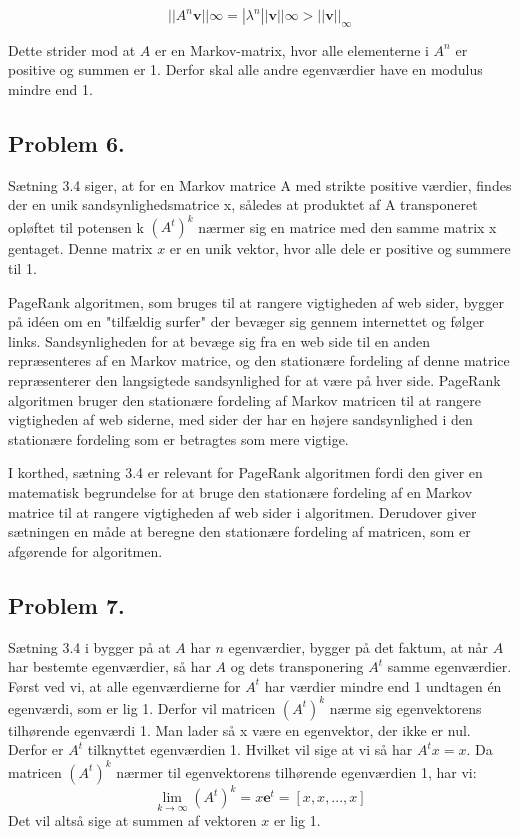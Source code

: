 $$||A^n\mathbf{v}||\infty = |\lambda^n||\mathbf{v}||\infty > ||\mathbf{v}||_\infty$$

Dette strider mod at $A$ er en Markov-matrix, hvor alle elementerne i $A^n$ er positive og summen er 1. Derfor skal alle andre egenværdier have en modulus mindre end 1.


\subsection*{Problem 6.}

Sætning 3.4 siger, at for en Markov matrice A med strikte positive værdier, findes der en unik sandsynlighedsmatrice x, således at produktet af A transponeret opløftet til potensen k $(A^t)^k$ nærmer sig en matrice med den samme matrix x gentaget. Denne matrix $x$ er en unik vektor, hvor alle dele er positive og summere til 1.

PageRank algoritmen, som bruges til at rangere vigtigheden af web sider, bygger på idéen om en "tilfældig surfer" der bevæger sig gennem internettet og følger links. Sandsynligheden for at bevæge sig fra en web side til en anden repræsenteres af en Markov matrice, og den stationære fordeling af denne matrice repræsenterer den langsigtede sandsynlighed for at være på hver side. PageRank algoritmen bruger den stationære fordeling af Markov matricen til at rangere vigtigheden af web siderne, med sider der har en højere sandsynlighed i den stationære fordeling som er betragtes som mere vigtige.

I korthed, sætning 3.4 er relevant for PageRank algoritmen fordi den giver en matematisk begrundelse for at bruge den stationære fordeling af en Markov matrice til at rangere vigtigheden af web sider i algoritmen. Derudover giver sætningen en måde at beregne den stationære fordeling af matricen, som er afgørende for algoritmen.

\newpage
\subsection*{Problem 7.}

Sætning 3.4 i bygger på at $A$ har $n$ egenværdier, bygger på det faktum, at når $A$ har bestemte egenværdier, så har $A$ og dets transponering $A^t$ samme egenværdier. Først ved vi, at alle egenværdierne for $A^t$ har værdier mindre end 1 undtagen én egenværdi, som er lig 1. Derfor vil matricen $(A^t)^k$ nærme sig egenvektorens tilhørende egenværdi 1. Man lader så x være en egenvektor, der ikke er nul. Derfor er $A^t$ tilknyttet egenværdien 1. Hvilket vil sige at vi så har $A^t x = x$. Da matricen $(A^t)^k$ nærmer til egenvektorens tilhørende egenværdien 1, har vi:
$$\lim_{k \to \infty} (A^t)^k = x\mathbf{e}^t = [x, x, . . ., x]$$
Det vil altså sige at summen af vektoren $x$ er lig 1.







